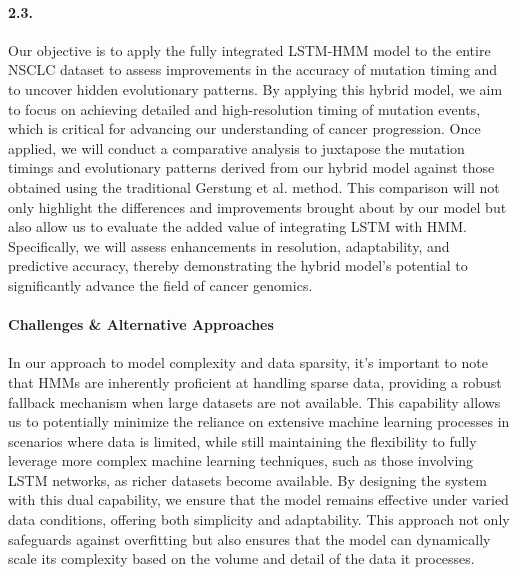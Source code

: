 \paragraph{2.3. \SpecificAimTwoC}

Our objective is to apply the fully integrated LSTM-HMM model to the entire NSCLC dataset to assess improvements 
in the accuracy of mutation timing and to uncover hidden evolutionary patterns. 
By applying this hybrid model, we aim to focus on achieving detailed and high-resolution timing of mutation events, 
which is critical for advancing our understanding of cancer progression. 
Once applied, we will conduct a comparative analysis to juxtapose the mutation timings and evolutionary patterns derived 
from our hybrid model against those obtained using the traditional Gerstung et al. method. 
This comparison will not only highlight the differences and improvements brought about by our model 
but also allow us to evaluate the added value of integrating LSTM with HMM. 
Specifically, we will assess enhancements in resolution, adaptability, and predictive accuracy, 
thereby demonstrating the hybrid model's potential to significantly advance the field of cancer genomics.

\paragraph{Challenges \& Alternative Approaches}

In our approach to model complexity and data sparsity, it's important to note that HMMs are inherently proficient at handling sparse data, 
providing a robust fallback mechanism when large datasets are not available. 
This capability allows us to potentially minimize the reliance on extensive machine learning processes in scenarios where data is limited, 
while still maintaining the flexibility to fully leverage more complex machine learning techniques, 
such as those involving LSTM networks, as richer datasets become available. 
By designing the system with this dual capability, we ensure that the model remains effective under varied data conditions,
offering both simplicity and adaptability. 
This approach not only safeguards against overfitting but also ensures that the model can dynamically scale its complexity 
based on the volume and detail of the data it processes.
